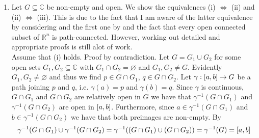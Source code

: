 \begin{enumerate}[label = \textbf{Exercise \arabic*.},wide = 0pt, itemsep=1.5ex]
\begin{enumerate}[label = (\roman*),wide = 10pt, itemsep=1.5ex]
\begin{proof}
			\noindent So $V^c$ is finite and therefore also $U$. Since $U$ is open we have that there exists $W_2 \in \mathcal{Z}$ such that $U = \cbr[0]{z_0}^c \cap W_2$. Taking again relative complements yields 
			\begin{equation*}
				U^c = \cbr[0]{z_0}^c \cap (\cbr[0]{z_0}^c \cap W_2)^c = \cbr[0]{z_0}^c \cap W_2^c \subseteq W_2^c
			\end{equation*}

			\noindent So $U^c$ is also finite. Therefore the decomposition $\cbr[0]{z_0}^c = U \cup U^c$ implies that $\cbr[0]{z_0}^c$ is finite. Contradiction, since $\abs[0]{\cbr[0]{z_0}^c} \geq \abs[0]{\mathbb{R}} = \mathfrak{c}$, which is clearly not finite.
		\end{proof}

		Therefore by lemma \ref{lem:z_0_quasi} we conclude that $(\cbr[0]{z_0}^c, \cbr[0]{z_0}^c \cap \mathcal{Z})$ is quasi-compact, but from lemma \ref{lem:z_0_not_haus} follows that $(\cbr[0]{z_0}^c, \cbr[0]{z_0}^c \cap \mathcal{Z})$ is not compact.
		
	\item By $\del[0]{\cbr[0]{z_0}^c}^c = \cbr[0]{z_0}$ which is finite immediately follows $\cbr[0]{z_0}^c \in \mathcal{Z}$. But $\cbr[0]{z_0}^c = \mathbb{C} \setminus \cbr[0]{z_0}$ is clearly not finite, thus $\cbr[0]{z_0} \notin \mathcal{Z}$, hence $\cbr[0]{z_0}^c$ cannot be closed. 
	\end{enumerate}

\item Let $G \subseteq \mathbb{C}$ be non-empty and open. We show the equivalences (i) $\Leftrightarrow$ (ii) and (ii) $\Leftrightarrow$ (iii). This is due to the fact that I am aware of the latter equivalence by considering \cite[86]{lee:topological_manifolds:2011} and the first one by \cite[90]{lee:topological_manifolds:2011} and the fact that every open connected subset of $\mathbb{R}^n$ is path-connected. However, working out detailed and appropriate proofs is still alot of work.\\
	Assume that (i) holds. Proof by contradiction. Let $G = G_1 \cup G_2$ for some open sets $G_1,G_2 \subseteq \mathbb{C}$ with $G_1 \cap G_2 = \varnothing$ and $G_1,G_2 \neq G$. Evidently $G_1,G_2 \neq \varnothing$ and thus we find $p \in G \cap G_1$, $q \in G \cap G_2$. Let $\gamma: \intcc{a,b} \to G$ be a path joining $p$ and $q$, i.e. $\gamma(a) = p$ and $\gamma(b) = q$. Since $\gamma$ is continuous, $G \cap G_1$ and $G \cap G_2$ are relatively open in $G$ we have that $\gamma^{-1}(G \cap G_1)$ and $\gamma^{-1}(G \cap G_2)$ are open in $\intcc{a,b}$. Furthermore, since $a \in \gamma^{-1}(G \cap G_1)$ and $b \in \gamma^{-1}(G \cap G_2)$ we have that both preimages are non-empty. By
	\begin{equation*}
		\gamma^{-1}(G \cap G_1) \cup \gamma^{-1}(G \cap G_2) = \gamma^{-1}((G \cap G_1) \cup (G \cap G_2)) = \gamma^{-1}(G) = \intcc{a,b}
	\end{equation*}


\end{enumerate}
